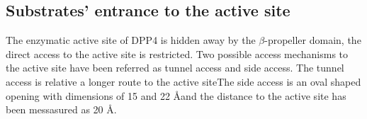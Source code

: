 \subsection{Substrates' entrance to the active site}

The enzymatic active site of DPP4 is hidden away by the $\beta$-propeller domain, the direct access to the active site is restricted. Two possible access mechanisms to the active site have been referred as tunnel access and side access. The tunnel access is relative a longer route to the active siteThe side access is an oval shaped opening with dimensions of 15 and 22 \AA and the distance to the active site has been messasured as 20 \AA.~\cite{Engel_2003}